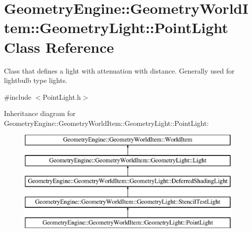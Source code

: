 \hypertarget{class_geometry_engine_1_1_geometry_world_item_1_1_geometry_light_1_1_point_light}{}\section{Geometry\+Engine\+::Geometry\+World\+Item\+::Geometry\+Light\+::Point\+Light Class Reference}
\label{class_geometry_engine_1_1_geometry_world_item_1_1_geometry_light_1_1_point_light}


Class that defines a light with attenuation with distance. Generally used for lightbulb type lights.  




{\ttfamily \#include $<$Point\+Light.\+h$>$}

Inheritance diagram for Geometry\+Engine\+::Geometry\+World\+Item\+::Geometry\+Light\+::Point\+Light\+:\begin{figure}[H]
\begin{center}
\leavevmode
\includegraphics[height=5.000000cm]{class_geometry_engine_1_1_geometry_world_item_1_1_geometry_light_1_1_point_light}
\end{center}
\end{figure}
